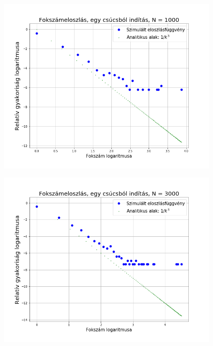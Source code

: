 \documentclass[a4paper, 12pt]{article}
\numberwithin{equation}{section}          %
\numberwithin{figure}{subsection}
\begin{document}
\begin{figure}[c]
	\begin{center}
		\includegraphics[width=1\textwidth]{elso1000log.png}
	\end{center}
\end{figure}

\begin{figure}[c!]
	\begin{center}
		\includegraphics[width=1\textwidth]{elso3000log.png}
	\end{center}
\end{figure}
\end{document}

